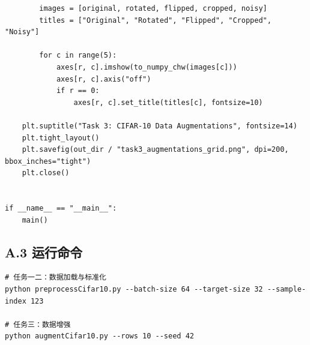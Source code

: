 \documentclass[12pt,a4paper]{ctexart}
\begin{document}
\begin{lstlisting}
        images = [original, rotated, flipped, cropped, noisy]
        titles = ["Original", "Rotated", "Flipped", "Cropped", "Noisy"]

        for c in range(5):
            axes[r, c].imshow(to_numpy_chw(images[c]))
            axes[r, c].axis("off")
            if r == 0:
                axes[r, c].set_title(titles[c], fontsize=10)

    plt.suptitle("Task 3: CIFAR-10 Data Augmentations", fontsize=14)
    plt.tight_layout()
    plt.savefig(out_dir / "task3_augmentations_grid.png", dpi=200, bbox_inches="tight")
    plt.close()


if __name__ == "__main__":
    main()
\end{lstlisting}

\subsection*{A.3 运行命令}
\begin{verbatim}
# 任务一二：数据加载与标准化
python preprocessCifar10.py --batch-size 64 --target-size 32 --sample-index 123

# 任务三：数据增强
python augmentCifar10.py --rows 10 --seed 42
\end{verbatim}
\end{document}
